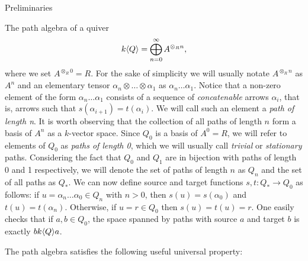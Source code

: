 \begin{chapter}{Preliminaries}
\begin{section}{The path algebra of a quiver}
\[
k\langle Q\rangle = \bigoplus_{n=0}^\infty A^{\otimes_R n},
\]
where we set $A^{\otimes_R 0}=R$. For the sake of simplicity we will usually notate $A^{\otimes_R n}$ as $A^n$ and an elementary tensor $\alpha_n\otimes\dots\otimes \alpha_1$ as $\alpha_n\dots\alpha_1$. Notice that a non-zero element of the form $\alpha_n\dots\alpha_1$ consists of a sequence of \emph{concatenable} arrows $\alpha_i$, that is, arrows such that $s(\alpha_{i+1})=t(\alpha_i)$. We will call such an element a \emph{path of length n}. It is worth observing that the collection of all paths of length $n$ form a basis of $A^n$ as a $k$-vector space. Since $Q_0$ is a basis of $A^0=R$, we will refer to elements of $Q_0$ as \emph{paths of length 0}, which we will usually call \emph{trivial} or \emph{stationary} paths. Considering the fact that $Q_0$ and $Q_1$ are in bijection with paths of length 0 and 1 respectively, we will denote the set of paths of length $n$ as $Q_n$ and the set of all paths as $Q_*$. We can now define source and target functions $s,t:Q_*\to Q_0$ as follows: if $u=\alpha_n\dots\alpha_0\in Q_n$ with $n>0$, then $s(u)=s(\alpha_0)$ and $t(u)=t(\alpha_n)$. Otherwise, if $u=r\in Q_0$ then $s(u)=t(u)=r$. One easily checks that if $a,b\in Q_0$, the space spanned by paths with source $a$ and target $b$ is exactly $bk\langle Q\rangle a$.

The path algebra satisfies the following useful universal property:


\end{section}
\end{chapter}
